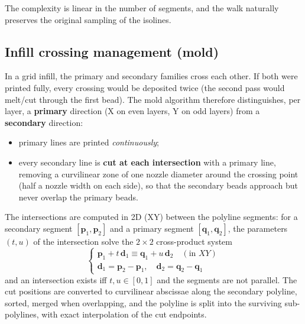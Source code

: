 The complexity is linear in the number of segments, and the walk
naturally preserves the original sampling of the isolines.

\subsection{Infill crossing management (mold)}\label{sec:meth-crossings}

In a grid infill, the primary and secondary families cross each other.
If both were printed fully, every crossing would be deposited twice
(the second pass would melt/cut through the first bead). The mold
algorithm therefore distinguishes, per layer, a \textbf{primary}
direction (X on even layers, Y on odd layers) from a
\textbf{secondary} direction:

\begin{itemize}
  \item primary lines are printed \emph{continuously};
  \item every secondary line is \textbf{cut at each intersection} with
        a primary line, removing a curvilinear zone of one nozzle
        diameter around the crossing point (half a nozzle width on
        each side), so that the secondary beads approach but never
        overlap the primary beads.
\end{itemize}

The intersections are computed in 2D (XY) between the polyline
segments: for a secondary segment $[\mathbf{p}_1, \mathbf{p}_2]$ and a
primary segment $[\mathbf{q}_1, \mathbf{q}_2]$, the parameters
$(t, u)$ of the intersection solve the $2 \times 2$ cross-product
system
\begin{equation}
  \begin{cases}
    \mathbf{p}_1 + t\,\mathbf{d}_1 \equiv \mathbf{q}_1 + u\,\mathbf{d}_2 \quad (\text{in } XY)\\
    \mathbf{d}_1 = \mathbf{p}_2 - \mathbf{p}_1,\quad
    \mathbf{d}_2 = \mathbf{q}_2 - \mathbf{q}_1
  \end{cases}
\end{equation}
and an intersection exists iff $t, u \in [0,1]$ and the segments are
not parallel. The cut positions are converted to curvilinear
abscissae along the secondary polyline, sorted, merged when
overlapping, and the polyline is split into the surviving
sub-polylines, with exact interpolation of the cut endpoints.

